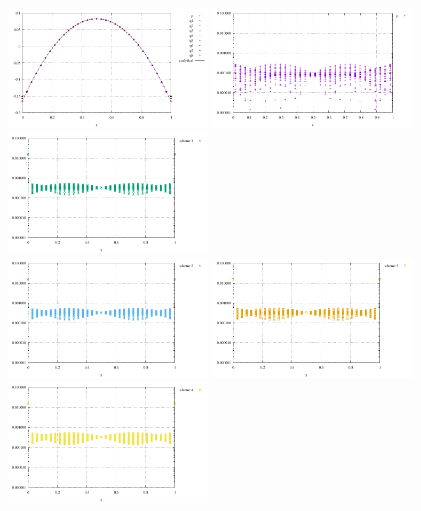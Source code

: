 \begin{center}
\includegraphics[width=5.3cm]{python_codes/fieldstone_12/results/reg/pressure}
\includegraphics[width=5.3cm]{python_codes/fieldstone_12/results/reg/p_error}
\includegraphics[width=5.3cm]{python_codes/fieldstone_12/results/reg/q1_error}\\
\includegraphics[width=5.3cm]{python_codes/fieldstone_12/results/reg/q2_error}
\includegraphics[width=5.3cm]{python_codes/fieldstone_12/results/reg/q3_error}
\includegraphics[width=5.3cm]{python_codes/fieldstone_12/results/reg/q4_error}\\

\end{center}
